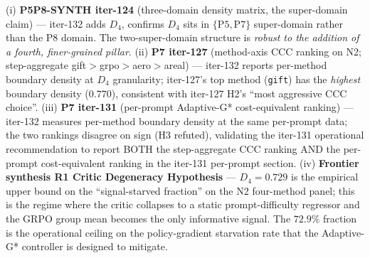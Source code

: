 (i) \textbf{P5P8-SYNTH iter-124} (three-domain density matrix, the
super-domain claim) — iter-132 adds $D_4$, confirms $D_4$ sits in
$\{\mathrm{P5},\mathrm{P7}\}$ super-domain rather than the $\mathrm{P8}$
domain. The two-super-domain structure is \emph{robust to the
addition of a fourth, finer-grained pillar}.
(ii) \textbf{P7 iter-127} (method-axis CCC ranking on N2; step-aggregate
gift$>\!$grpo$>\!$aero$>\!$areal) — iter-132 reports per-method
boundary density at $D_4$ granularity; iter-127's top method
(\texttt{gift}) has the \emph{highest} boundary density ($0.770$),
consistent with iter-127 H2's ``most aggressive CCC choice''.
(iii) \textbf{P7 iter-131} (per-prompt Adaptive-G* cost-equivalent
ranking) — iter-132 measures per-method boundary density at the same
per-prompt data; the two rankings disagree on sign (H3 refuted),
validating the iter-131 operational recommendation to report BOTH the
step-aggregate CCC ranking AND the per-prompt cost-equivalent ranking
in the iter-131 per-prompt section.
(iv) \textbf{Frontier synthesis R1 Critic Degeneracy Hypothesis} —
$D_4 = 0.729$ is the empirical upper bound on the ``signal-starved
fraction'' on the N2 four-method panel; this is the regime where the
critic collapses to a static prompt-difficulty regressor and the GRPO
group mean becomes the only informative signal. The $72.9\%$ fraction
is the operational ceiling on the policy-gradient starvation rate that
the Adaptive-G* controller is designed to mitigate.
